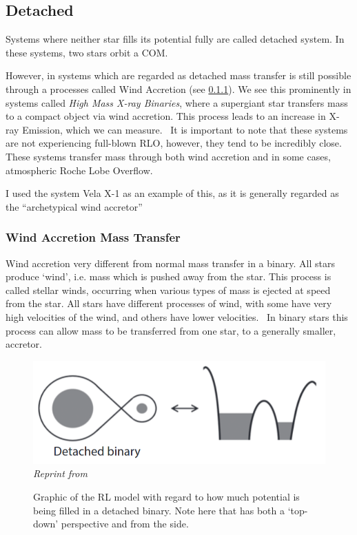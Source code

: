 \documentclass[12pt, letterpaper]{article}
\begin{document}
        \subsection{\centering Detached}

        Systems where neither star fills its potential fully are called detached system. In these systems, two stars orbit a COM.

        However, in systems which are regarded as detached mass transfer is still possible through a processes called Wind Accretion (see \ref{WindAccretion}). We see this prominently in systems called \textit{High Mass X-ray Binaries}, where a supergiant star transfers mass to a compact object via wind accretion. This process leads to an increase in X-ray Emission, which we can measure.~\cite{TaurisvandenHeuvel+2023} It is important to note that these systems are not experiencing full-blown RLO, however, they tend to be incredibly close. \cite{TaurisvandenHeuvel+2023} These systems transfer mass through both wind accretion and in some cases, atmospheric Roche Lobe Overflow.

        I used the system Vela X-1 \cite{Kretschmar_2021} as an example of this, as it is generally regarded as the ``archetypical wind accretor''~\cite{Kretschmar_2021} 

        \subsubsection{Wind Accretion Mass Transfer} \label{WindAccretion}
        Wind accretion very different from normal mass transfer in a binary. All stars produce `wind', i.e. mass which is pushed away from the star. This process is called stellar winds, occurring when various types of mass is ejected at speed from the star. All stars have different processes of wind, with some have very high velocities of the wind, and others have lower velocities.~\cite{Lamers_1999} In binary stars this process can allow mass to be transferred from one star, to a generally smaller, accretor.
        
        
        \begin{figure}[h!]
            \centering
            \includegraphics[scale = .4]{Figs/Detached binary.png}\\
            \textit{Reprint from~\cite{TaurisvandenHeuvel+2023}}
            \caption{Graphic of the RL model with regard to how much potential is being filled in a detached binary. Note here that has both a `top-down' perspective and from the side.}
            \label{DetachedBinaryRL}
        \end{figure}
        
\end{document}

